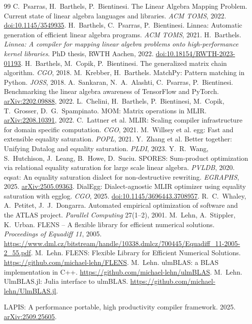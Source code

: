 \documentclass[11pt,a4paper]{article}
\begin{document}
\begin{thebibliography}{99}\small
{} C.~Psarras, H.~Barthels, P.~Bientinesi.
  The Linear Algebra Mapping Problem. Current state of linear algebra
  languages and libraries. \emph{ACM TOMS}, 2022.
  \href{https://doi.org/10.1145/3549935}{doi:10.1145/3549935}.
 H.~Barthels, C.~Psarras, P.~Bientinesi.
  Linnea: Automatic generation of efficient linear algebra programs.
  \emph{ACM TOMS}, 2021.
 H.~Barthels.
  \emph{Linnea: A compiler for mapping linear algebra problems onto
  high-performance kernel libraries}. PhD thesis, RWTH Aachen, 2022.
  \href{https://doi.org/10.18154/RWTH-2023-01193}{doi:10.18154/RWTH-2023-01193}.
 H.~Barthels, M.~Copik, P.~Bientinesi.
  The generalized matrix chain algorithm. \emph{CGO}, 2018.
 M.~Krebber, H.~Barthels.
  MatchPy: Pattern matching in Python. \emph{JOSS}, 2018.
 A.~Sankaran, N.~A.~Alashti, C.~Psarras, P.~Bientinesi.
  Benchmarking the linear algebra awareness of TensorFlow and PyTorch.
  \href{https://arxiv.org/abs/2202.09888}{arXiv:2202.09888}, 2022.
 L.~Chelini, H.~Barthels, P.~Bientinesi, M.~Copik,
  T.~Grosser, D.~G.~Spampinato.
  MOM: Matrix operations in MLIR.
  \href{https://arxiv.org/abs/2208.10391}{arXiv:2208.10391}, 2022.
 C.~Lattner et al.
  MLIR: Scaling compiler infrastructure for domain specific computation.
  \emph{CGO}, 2021.
 M.~Willsey et al.
  egg: Fast and extensible equality saturation. \emph{POPL}, 2021.
 Y.~Zhang et al.
  Better together: Unifying Datalog and equality saturation.
  \emph{PLDI}, 2023.
 Y.~R.~Wang, S.~Hutchison, J.~Leang, B.~Howe, D.~Suciu.
  SPORES: Sum-product optimization via relational equality saturation
  for large scale linear algebra. \emph{PVLDB}, 2020.
 eqsat: An equality saturation dialect for non-destructive
  rewriting. \emph{EGRAPHS}, 2025.
  \href{https://arxiv.org/abs/2505.09363}{arXiv:2505.09363}.
 DialEgg: Dialect-agnostic MLIR optimizer using equality
  saturation with egglog. \emph{CGO}, 2025.
  \href{https://doi.org/10.1145/3696443.3708957}{doi:10.1145/3696443.3708957}.
 R.~C.~Whaley, A.~Petitet, J.~J.~Dongarra.
  Automated empirical optimization of software and the ATLAS project.
  \emph{Parallel Computing} 27(1--2), 2001.
 M.~Lehn, A.~Stippler, K.~Urban.
  FLENS -- A flexible library for efficient numerical solutions.
  \emph{Proceedings of Equadiff 11}, 2005.
  \url{https://www.dml.cz/bitstream/handle/10338.dmlcz/700445/Equadiff_11-2005-2_55.pdf}.
 M.~Lehn.
  FLENS: Flexible Library for Efficient Numerical Solutions.
  \url{https://github.com/michael-lehn/FLENS}.
 M.~Lehn.
  ulmBLAS: a BLAS implementation in C++.
  \url{https://github.com/michael-lehn/ulmBLAS}.
 M.~Lehn.
  UlmBLAS.jl: Julia interface to ulmBLAS.
  \url{https://github.com/michael-lehn/UlmBLAS.jl}.

 LAPIS: A performance portable, high productivity compiler
  framework. 2025.
  \href{https://arxiv.org/abs/2509.25605}{arXiv:2509.25605}.
\end{thebibliography}
\end{document}
